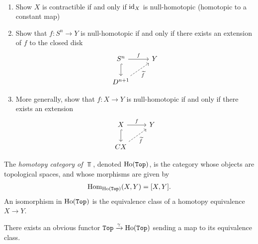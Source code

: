 \documentclass{article}[11pt]
\begin{document}
\begin{exercise} $\ $
\begin{enumerate}
	\item Show $X$ is contractible if and only if $\text{id}_X$ is null-homotopic (homotopic to a constant map)
	\item Show that $f: S^n \to Y$ is null-homotopic if and only if there exists an extension of $f$ to the closed disk
	\[
		\begin{tikzcd}
		S^n\rar["f"]\dar[hook] & Y \\
		D^{n+1}\ar[ur,dashed,"\widetilde{f}" below right] &
		\end{tikzcd}
	\]

	\item More generally, show that $f: X \to Y$ is null-homotopic if and only if there exists an extension
	\[
		\begin{tikzcd}
		X\rar["f"]\dar[hook] & Y \\
		CX\ar[ur,dashed,"\widetilde{f}" below right] &
		\end{tikzcd}
	\]
\end{enumerate}
\end{exercise}




\begin{definition} The \textit{homotopy category of $\Top$}, denoted $\text{Ho}(\texttt{Top})$, is the category whose objects are topological spaces, and whose morphisms are given by
\begin{align*}
	\textup{Hom}_{\text{Ho}(\texttt{Top})} (X,Y) = [X,Y].
\end{align*}
An isomorphism in $\text{Ho}(\texttt{Top})$ is the equivalence class of a homotopy equivalence $X\to Y$.
\end{definition}

There exists an obvious functor $\texttt{Top} \xrightarrow{\gamma} \text{Ho}(\texttt{Top})$ sending a map to its equivalence class.
\end{document}
